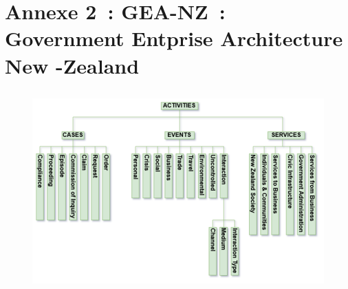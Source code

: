 \documentclass[12pt]{report}
\begin{document}
\newpage
\vspace{\baselineskip}\section*{Annexe 2 : GEA-NZ : Government Entprise Architecture New -Zealand}



\begin{figure}[H]
	\begin{center}		\includegraphics[width=5.3in,height=3.0in]{./media/image21.png}
	\end{center}\end{figure}





\end{document}
